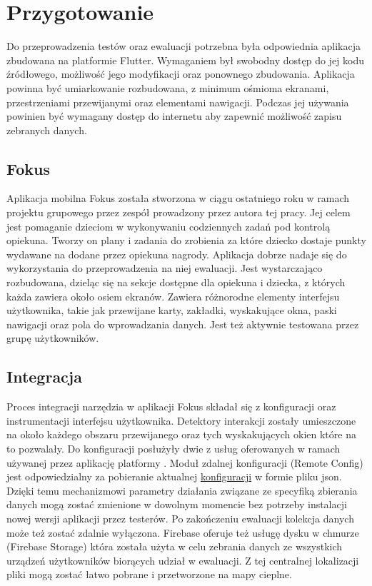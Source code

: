 \section{Przygotowanie}
Do przeprowadzenia testów oraz ewaluacji potrzebna była odpowiednia aplikacja zbudowana na platformie Flutter. Wymaganiem był swobodny dostęp do jej kodu źródłowego, możliwość jego modyfikacji oraz ponownego zbudowania. Aplikacja powinna być umiarkowanie rozbudowana, z minimum ośmioma ekranami, przestrzeniami przewijanymi oraz elementami nawigacji. Podczas jej używania powinien być wymagany dostęp do internetu aby zapewnić możliwość zapisu zebranych danych. 

\subsection{Fokus}
Aplikacja mobilna Fokus została stworzona w ciągu ostatniego roku w ramach projektu grupowego przez zespół prowadzony przez autora tej pracy. Jej celem jest pomaganie dzieciom w wykonywaniu codziennych zadań pod kontrolą opiekuna. Tworzy on plany i zadania do zrobienia za które dziecko dostaje punkty wydawane na dodane przez opiekuna nagrody. Aplikacja dobrze nadaje się do wykorzystania do przeprowadzenia na niej ewaluacji. Jest wystarczająco rozbudowana, dzieląc się na sekcje dostępne dla opiekuna i dziecka, z których każda zawiera około osiem ekranów. Zawiera różnorodne elementy interfejsu użytkownika, takie jak przewijane karty, zakładki, wyskakujące okna, paski nawigacji oraz pola do wprowadzania danych. Jest też aktywnie testowana przez grupę użytkowników.

\subsection{Integracja}
Proces integracji narzędzia w aplikacji Fokus składał się z konfiguracji oraz instrumentacji interfejsu użytkownika. Detektory interakcji zostały umieszczone na około każdego obszaru przewijanego oraz tych wyskakujących okien które na to pozwalały. Do konfiguracji posłużyły dwie z usług oferowanych w ramach używanej przez aplikację platformy . Moduł zdalnej konfiguracji (Remote Config) jest odpowiedzialny za pobieranie aktualnej \hyperref[sec:rs_config]{konfiguracji} w formie pliku json. Dzięki temu mechanizmowi parametry działania związane ze specyfiką zbierania danych mogą zostać zmienione w dowolnym momencie bez potrzeby instalacji nowej wersji aplikacji przez testerów. Po zakończeniu ewaluacji kolekcja danych może też zostać zdalnie wyłączona. Firebase oferuje też usługę dysku w chmurze (Firebase Storage) która została użyta w celu zebrania danych ze wszystkich urządzeń użytkowników biorących udział w ewaluacji. Z tej centralnej lokalizacji pliki mogą zostać łatwo pobrane i przetworzone na mapy cieplne.
